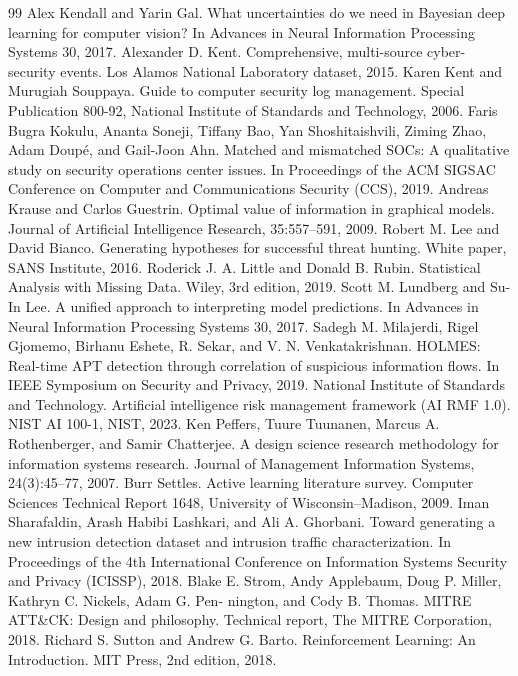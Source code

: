 \documentclass[a4paper,11pt,oneside]{article}
\begin{document}
\begin{thebibliography}{99}
 Alex Kendall and Yarin Gal. What uncertainties do we need in Bayesian deep learning for computer vision? In Advances in Neural Information Processing Systems 30, 2017.
 Alexander D. Kent. Comprehensive, multi-source cyber-security events. Los Alamos National Laboratory dataset, 2015.
 Karen Kent and Murugiah Souppaya. Guide to computer security log management. Special Publication 800-92, National Institute of Standards and Technology, 2006.
 Faris Bugra Kokulu, Ananta Soneji, Tiffany Bao, Yan Shoshitaishvili, Ziming Zhao, Adam Doupé, and Gail-Joon Ahn. Matched and mismatched SOCs: A qualitative study on security operations center issues. In Proceedings of the ACM SIGSAC Conference on Computer and Communications Security (CCS), 2019.
 Andreas Krause and Carlos Guestrin. Optimal value of information in graphical models. Journal of Artificial Intelligence Research, 35:557–591, 2009.
 Robert M. Lee and David Bianco. Generating hypotheses for successful threat hunting. White paper, SANS Institute, 2016.
 Roderick J. A. Little and Donald B. Rubin. Statistical Analysis with Missing Data. Wiley, 3rd edition, 2019.
 Scott M. Lundberg and Su-In Lee. A unified approach to interpreting model predictions. In Advances in Neural Information Processing Systems 30, 2017.
 Sadegh M. Milajerdi, Rigel Gjomemo, Birhanu Eshete, R. Sekar, and V. N. Venkatakrishnan. HOLMES: Real-time APT detection through correlation of suspicious information flows. In IEEE Symposium on Security and Privacy, 2019.
 National Institute of Standards and Technology. Artificial intelligence risk management framework (AI RMF 1.0). NIST AI 100-1, NIST, 2023.
 Ken Peffers, Tuure Tuunanen, Marcus A. Rothenberger, and Samir Chatterjee. A design science research methodology for information systems research. Journal of Management Information Systems, 24(3):45–77, 2007.
 Burr Settles. Active learning literature survey. Computer Sciences Technical Report 1648, University of Wisconsin–Madison, 2009.
 Iman Sharafaldin, Arash Habibi Lashkari, and Ali A. Ghorbani. Toward generating a new intrusion detection dataset and intrusion traffic characterization. In Proceedings of the 4th International Conference on Information Systems Security and Privacy (ICISSP), 2018.
 Blake E. Strom, Andy Applebaum, Doug P. Miller, Kathryn C. Nickels, Adam G. Pen- nington, and Cody B. Thomas. MITRE ATT\&CK: Design and philosophy. Technical report, The MITRE Corporation, 2018.
 Richard S. Sutton and Andrew G. Barto. Reinforcement Learning: An Introduction. MIT Press, 2nd edition, 2018.
\end{thebibliography}
\appendix
\end{document}
